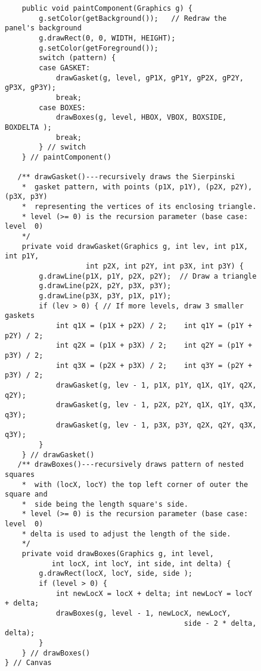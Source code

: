 \begin{figure}[p]
\addtocounter{figure}{-1}
\jjjprogstart
\begin{jjjlisting}[33pc]
\begin{lstlisting}
    public void paintComponent(Graphics g) {
        g.setColor(getBackground());   // Redraw the panel's background
        g.drawRect(0, 0, WIDTH, HEIGHT);
        g.setColor(getForeground());
        switch (pattern) {
        case GASKET:
            drawGasket(g, level, gP1X, gP1Y, gP2X, gP2Y, gP3X, gP3Y);
            break;
        case BOXES:
            drawBoxes(g, level, HBOX, VBOX, BOXSIDE, BOXDELTA );
            break;
        } // switch
    } // paintComponent()

   /** drawGasket()---recursively draws the Sierpinski 
    *  gasket pattern, with points (p1X, p1Y), (p2X, p2Y), (p3X, p3Y) 
    *  representing the vertices of its enclosing triangle.
    * level (>= 0) is the recursion parameter (base case: level  0)
    */
    private void drawGasket(Graphics g, int lev, int p1X, int p1Y,
                   int p2X, int p2Y, int p3X, int p3Y) {
        g.drawLine(p1X, p1Y, p2X, p2Y);  // Draw a triangle
        g.drawLine(p2X, p2Y, p3X, p3Y);
        g.drawLine(p3X, p3Y, p1X, p1Y);
        if (lev > 0) { // If more levels, draw 3 smaller gaskets
            int q1X = (p1X + p2X) / 2;    int q1Y = (p1Y + p2Y) / 2;
            int q2X = (p1X + p3X) / 2;    int q2Y = (p1Y + p3Y) / 2;
            int q3X = (p2X + p3X) / 2;    int q3Y = (p2Y + p3Y) / 2;
            drawGasket(g, lev - 1, p1X, p1Y, q1X, q1Y, q2X, q2Y);
            drawGasket(g, lev - 1, p2X, p2Y, q1X, q1Y, q3X, q3Y);
            drawGasket(g, lev - 1, p3X, p3Y, q2X, q2Y, q3X, q3Y);
        }
    } // drawGasket()
   /** drawBoxes()---recursively draws pattern of nested squares 
    *  with (locX, locY) the top left corner of outer the square and
    *  side being the length square's side.
    * level (>= 0) is the recursion parameter (base case: level  0)
    * delta is used to adjust the length of the side.
    */
    private void drawBoxes(Graphics g, int level,
           int locX, int locY, int side, int delta) {
        g.drawRect(locX, locY, side, side );
        if (level > 0) {
            int newLocX = locX + delta; int newLocY = locY + delta;
            drawBoxes(g, level - 1, newLocX, newLocY,
                                          side - 2 * delta, delta);
        }
    } // drawBoxes()
} // Canvas
\end{lstlisting}
\end{jjjlisting}
\end{figure}
\mbox{ }


